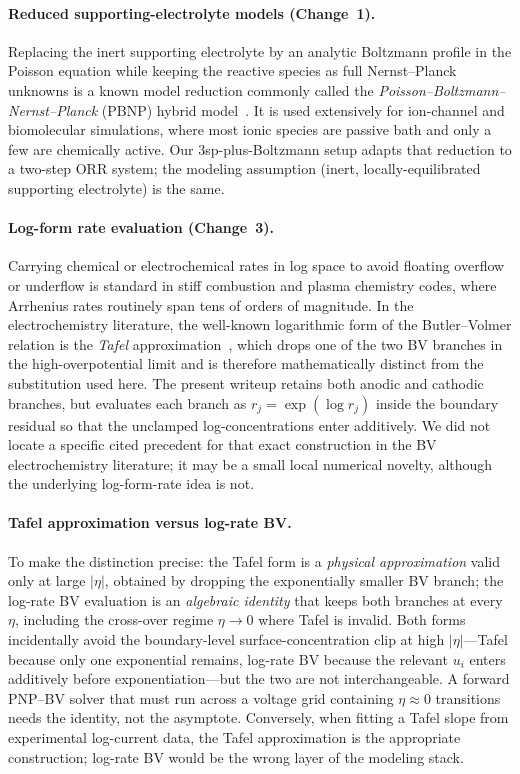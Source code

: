 \documentclass[11pt]{article}
\begin{document}
\paragraph{Reduced supporting-electrolyte models (Change~1).}
Replacing the inert supporting electrolyte by an analytic Boltzmann profile
in the Poisson equation while keeping the reactive species as full
Nernst--Planck unknowns is a known model reduction commonly called the
\emph{Poisson--Boltzmann--Nernst--Planck} (PBNP) hybrid
model~\cite{ZhengChenWei2011}. It is used extensively for ion-channel and
biomolecular simulations, where most ionic species are passive bath and only
a few are chemically active. Our 3sp-plus-Boltzmann setup adapts that
reduction to a two-step ORR system; the modeling assumption (inert,
locally-equilibrated supporting electrolyte) is the same.

\paragraph{Log-form rate evaluation (Change~3).}
Carrying chemical or electrochemical rates in log space to avoid floating
overflow or underflow is standard in stiff combustion and plasma chemistry
codes, where Arrhenius rates routinely span tens of orders of magnitude. In
the electrochemistry literature, the well-known logarithmic form of the
Butler--Volmer relation is the \emph{Tafel} approximation~\cite{Tafel1905},
which drops one of the two BV branches in the high-overpotential limit and
is therefore mathematically distinct from the substitution used here. The
present writeup retains both anodic and cathodic branches, but evaluates
each branch as $r_j = \exp(\log r_j)$ inside the boundary residual so that
the unclamped log-concentrations enter additively. We did not locate a
specific cited precedent for that exact construction in the BV
electrochemistry literature; it may be a small local numerical novelty,
although the underlying log-form-rate idea is not.

\paragraph{Tafel approximation versus log-rate BV.}
To make the distinction precise: the Tafel form is a \emph{physical
approximation} valid only at large $|\eta|$, obtained by dropping the
exponentially smaller BV branch; the log-rate BV evaluation is an
\emph{algebraic identity} that keeps both branches at every $\eta$,
including the cross-over regime $\eta \to 0$ where Tafel is invalid. Both
forms incidentally avoid the boundary-level surface-concentration clip at
high $|\eta|$---Tafel because only one exponential remains, log-rate BV
because the relevant $u_i$ enters additively before exponentiation---but
the two are not interchangeable. A forward PNP--BV solver that must run
across a voltage grid containing $\eta \approx 0$ transitions needs the
identity, not the asymptote. Conversely, when fitting a Tafel slope from
experimental log-current data, the Tafel approximation is the appropriate
construction; log-rate BV would be the wrong layer of the modeling
stack.
\end{document}
